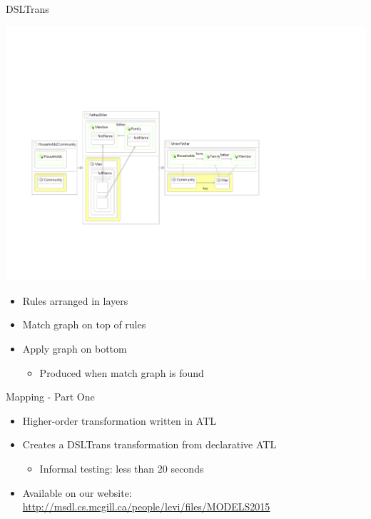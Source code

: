 \documentclass[xcolor=dvipsnames, 12pt]{beamer}
\begin{document}
\begin{frame}{DSLTrans}
\begin{center}
\includegraphics[width=\textwidth]{figures/Rules}
\end{center}

\begin{itemize}
\item Rules arranged in layers
\item Match graph on top of rules
\item Apply graph on bottom
\begin{itemize}
\item Produced when match graph is found
\end{itemize}
\end{itemize}
\end{frame}

\begin{frame}{Mapping - Part One}
\begin{itemize}
\item Higher-order transformation written in ATL
\item Creates a DSLTrans transformation from declarative ATL
\begin{itemize}
\item Informal testing: less than 20 seconds
\end{itemize}
\item Available on our website: \url{http://msdl.cs.mcgill.ca/people/levi/files/MODELS2015}
\end{itemize}
\end{frame}
\end{document}
